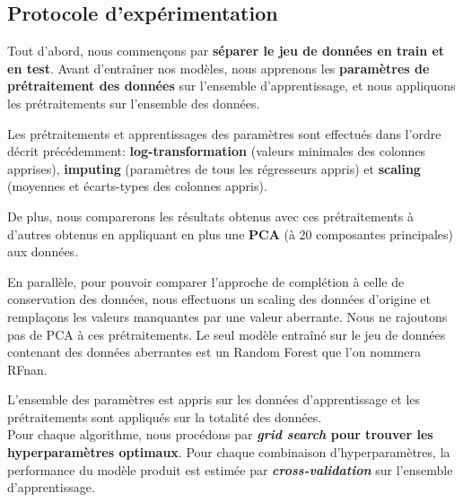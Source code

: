 \documentclass[12pt]{article}
\begin{document}
\subsection{Protocole d'expérimentation} 

Tout d'abord, nous commençons par \textbf{séparer le jeu de données en train et
en test}.  Avant d'entraîner nos modèles, nous apprenons les \textbf{paramètres
de prétraitement des données} sur l'ensemble d'apprentissage, et nous appliquons
les prétraitements sur l'ensemble des données. 

Les prétraitements et apprentissages des paramètres sont effectués dans l'ordre
décrit précédemment: \textbf{log-transformation} (valeurs minimales des colonnes
apprises), \textbf{imputing} (paramètres de tous les régresseurs appris) et
\textbf{scaling} (moyennes et écarts-types des colonnes appris).
\begin{mdframed}[hidealllines=true,backgroundcolor=blue!20] De plus, nous
    comparerons les résultats obtenus avec ces prétraitements à d'autres obtenus
    en appliquant en plus une \textbf{PCA} (à 20 composantes principales) aux
    données.
\end{mdframed}

\begin{mdframed}[hidealllines=true,backgroundcolor=blue!20] En parallèle, pour
    pouvoir comparer l'approche de complétion à celle de conservation des
    données, nous effectuons un scaling des données d'origine et remplaçons les
    valeurs manquantes par une valeur aberrante. Nous ne rajoutons pas de PCA à
    ces prétraitements. Le seul modèle entraîné sur le jeu de données contenant des
    données aberrantes est un Random Forest que l'on nommera RFnan. \end{mdframed}


L'ensemble des paramètres est appris sur les données d'apprentissage et les
prétraitements sont appliqués sur la totalité des données. \\

Pour chaque algorithme, nous procédons par \textbf{\emph{grid search} pour
trouver les hyperparamètres optimaux}. Pour chaque combinaison
d'hyperparamètres, la performance du modèle produit est estimée par
\textbf{\emph{cross-validation}} sur l'ensemble d'apprentissage. \\
\end{document}
